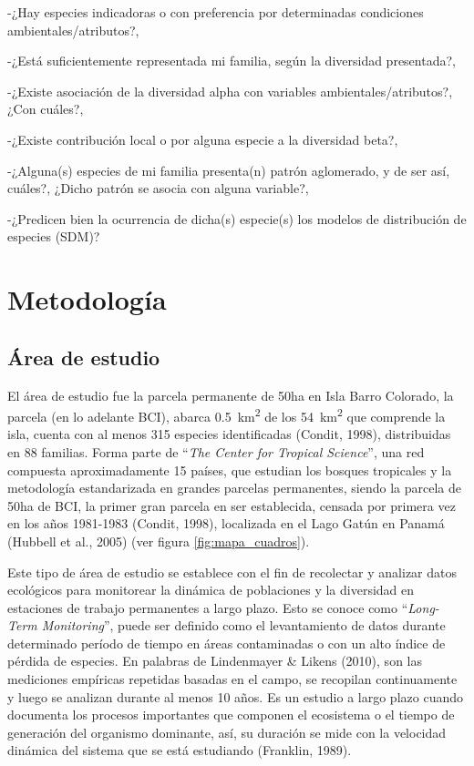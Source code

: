\documentclass[11pt,]{article}
\begin{document}
-¿Hay especies indicadoras o con preferencia por determinadas
condiciones ambientales/atributos?,

-¿Está suficientemente representada mi familia, según la diversidad
presentada?,

-¿Existe asociación de la diversidad alpha con variables
ambientales/atributos?, ¿Con cuáles?,

-¿Existe contribución local o por alguna especie a la diversidad beta?,

-¿Alguna(s) especies de mi familia presenta(n) patrón aglomerado, y de
ser así, cuáles?, ¿Dicho patrón se asocia con alguna variable?,

-¿Predicen bien la ocurrencia de dicha(s) especie(s) los modelos de
distribución de especies (SDM)?

\section{Metodología}\label{metodologuxeda}

\subsection{Área de estudio}\label{uxe1rea-de-estudio}

El área de estudio fue la parcela permanente de 50ha en Isla Barro
Colorado, la parcela (en lo adelante BCI), abarca
0.5~km\textsuperscript{2} de los 54~km\textsuperscript{2} que comprende
la isla, cuenta con al menos 315 especies identificadas (Condit, 1998),
distribuidas en 88 familias. Forma parte de ``\emph{The Center for
Tropical Science}'', una red compuesta aproximadamente 15 países, que
estudian los bosques tropicales y la metodología estandarizada en
grandes parcelas permanentes, siendo la parcela de 50ha de BCI, la
primer gran parcela en ser establecida, censada por primera vez en los
años 1981-1983 (Condit, 1998), localizada en el Lago Gatún en Panamá
(Hubbell et al., 2005) (ver figura \ref{fig:mapa_cuadros}).

Este tipo de área de estudio se establece con el fin de recolectar y
analizar datos ecológicos para monitorear la dinámica de poblaciones y
la diversidad en estaciones de trabajo permanentes a largo plazo. Esto
se conoce como ``\emph{Long-Term Monitoring}'', puede ser definido como
el levantamiento de datos durante determinado período de tiempo en áreas
contaminadas o con un alto índice de pérdida de especies. En palabras de
Lindenmayer \& Likens (2010), son las mediciones empíricas repetidas
basadas en el campo, se recopilan continuamente y luego se analizan
durante al menos 10 años. Es un estudio a largo plazo cuando documenta
los procesos importantes que componen el ecosistema o el tiempo de
generación del organismo dominante, así, su duración se mide con la
velocidad dinámica del sistema que se está estudiando (Franklin, 1989).
\end{document}
